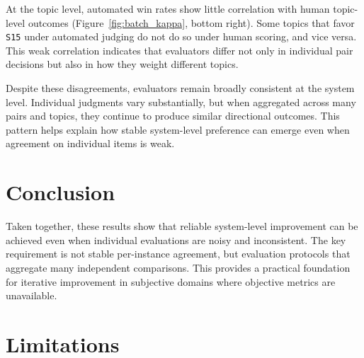 \documentclass{article}
\begin{document}
At the topic level, automated win rates show little correlation with human topic-level outcomes (Figure~\ref{fig:batch_kappa}, bottom right). Some topics that favor \texttt{S15} under automated judging do not do so under human scoring, and vice versa. This weak correlation indicates that evaluators differ not only in individual pair decisions but also in how they weight different topics.

Despite these disagreements, evaluators remain broadly consistent at the system level. Individual judgments vary substantially, but when aggregated across many pairs and topics, they continue to produce similar directional outcomes. This pattern helps explain how stable system-level preference can emerge even when agreement on individual items is weak.

\section{Conclusion}

Taken together, these results show that reliable system-level improvement can be achieved even when individual evaluations are noisy and inconsistent. The key requirement is not stable per-instance agreement, but evaluation protocols that aggregate many independent comparisons. This provides a practical foundation for iterative improvement in subjective domains where objective metrics are unavailable.

\section{Limitations}
\label{sec:limits}
\end{document}
